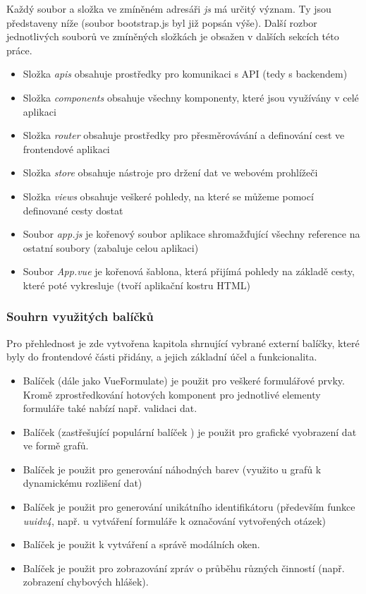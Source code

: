 	Každý soubor a složka ve zmíněném adresáři \textit{js} má určitý význam. Ty jsou představeny níže (soubor bootstrap.js byl již popsán výše). Další rozbor jednotlivých souborů ve zmíněných složkách je obsažen v dalších sekcích této práce.
	\begin{itemize}
		\item Složka \textit{apis} obsahuje prostředky pro komunikaci s API (tedy s backendem)
		\item Složka \textit{components} obsahuje všechny komponenty, které jsou využívány v celé aplikaci
		\item Složka \textit{router} obsahuje prostředky pro přesměrovávání a definování cest ve frontendové aplikaci
		\item Složka \textit{store} obsahuje nástroje pro držení dat ve webovém prohlížeči
		\item Složka \textit{views} obsahuje veškeré pohledy, na které se můžeme pomocí definované cesty dostat
		\item Soubor \textit{app.js} je kořenový soubor aplikace shromažďující všechny reference na ostatní soubory (zabaluje celou aplikaci)
		\item Soubor \textit{App.vue} je kořenová šablona, která přijímá pohledy na základě cesty, které poté vykresluje (tvoří aplikační kostru HTML)
	\end{itemize}

		\subsubsection{Souhrn využitých balíčků}\label{sec:fe_packages}
		Pro přehlednost je zde vytvořena kapitola shrnující vybrané externí balíčky, které byly do frontendové části přidány, a jejich základní účel a funkcionalita.
		
		\begin{itemize}
			\item Balíček  (dále jako VueFormulate) je použit pro veškeré formulářové prvky. Kromě zprostředkování hotových komponent pro jednotlivé elementy formuláře také nabízí např. validaci dat.
			\item Balíček  (zastřešující populární balíček ) je použit pro grafické vyobrazení dat ve formě grafů.
			\item Balíček  je použit pro generování náhodných barev (využito u grafů k dynamickému rozlišení dat)
			\item Balíček  je použit pro generování unikátního identifikátoru (především funkce \textit{uuidv4}, např. u vytváření formuláře k označování vytvořených otázek)
			\item Balíček  je použit k vytváření a správě modálních oken.
			\item Balíček  je použit pro zobrazování zpráv o průběhu různých činností (např. zobrazení chybových hlášek).
		\end{itemize}
	
